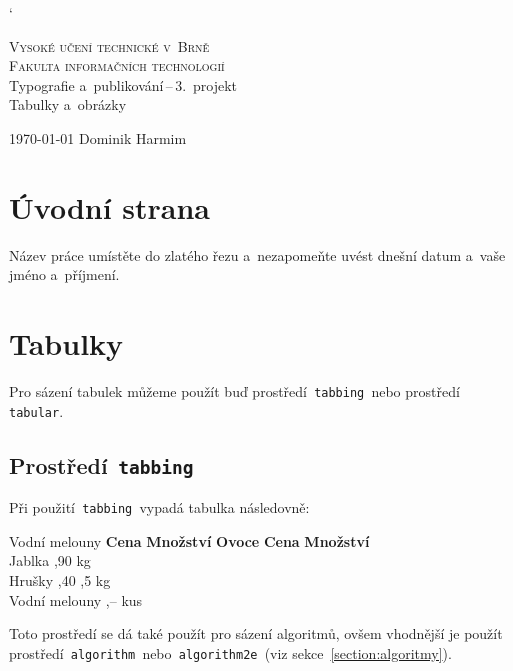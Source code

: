 \documentclass[a4paper, 11pt]{article}
\begin{document}
	\catcode`

	\begin{titlepage}
		\begin{center}
			\Huge
			\textsc{Vysoké učení technické v~Brně} \\
			\huge
			\textsc{Fakulta informačních technologií} \\
			\LARGE
			Typografie a~publikování\,--\,3.~projekt \\
			\Huge
			Tabulky a~obrázky
		\end{center}

		{\Large
			\today
			\hfill
			Dominik Harmim
		}
	\end{titlepage}


	\section{Úvodní strana}

	Název práce umístěte do zlatého řezu a~nezapomeňte uvést dnešní datum a~vaše jméno a~příjmení.


	\section{Tabulky}

	Pro sázení tabulek můžeme použít buď prostředí\texttt{ tabbing }nebo prostředí\texttt{ tabular}.


	\subsection{Prostředí\texttt{ tabbing}}

	Při použití\texttt{ tabbing }vypadá tabulka následovně:
	\begin{tabbing}
		Vodní melouny \quad	\= \textbf{Cena} \quad	\= \textbf{Množství}	\kill
		\textbf{Ovoce}		\> \textbf{Cena}		\> \textbf{Množství}	\\
		Jablka				,90				 kg					\\
		Hrušky				,40				,5 kg				\\
		Vodní melouny		,--				 kus				\\
	\end{tabbing}
	Toto prostředí se dá také použít pro sázení algoritmů, ovšem vhodnější je použít
	prostředí\texttt{ algorithm }nebo\texttt{ algorithm2e }(viz sekce~\ref{section:algoritmy}).
\end{document}
